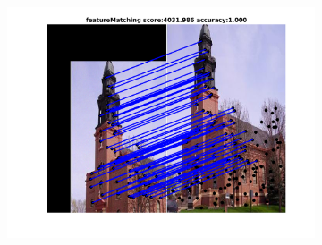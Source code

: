 \begin{figure}[h]
\begin{subfigure}[b]{0.33\textwidth}
		\includegraphics[scale=0.25]{"chapter3/fig/ImageTrafo/anchor_descr/using_cpd_afftrafo/fi_4_featureMatching"} 
	\end{subfigure} 	
	

\end{figure}
